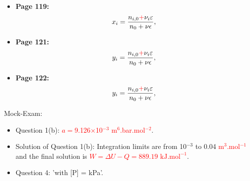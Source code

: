 \documentclass[12pts,a4paper,amsmath,amssymb,floatfix]{article}%
\newcommand{\frc}{\displaystyle\frac}
\newcommand{\red}{\textcolor{red}}
\begin{document}
\begin{itemize}
   \item {\bf Page 119:}
         \begin{displaymath}
            x_{i} = \frc{n_{i,0} \red{+} \nu_{i}\varepsilon}{n_{0}+\nu\epsilon},
         \end{displaymath}   

   \item {\bf Page 121:}
         \begin{displaymath}
            y_{i} = \frc{n_{i,0} \red{+} \nu_{i}\varepsilon}{n_{0}+\nu\epsilon},
         \end{displaymath} 

   \item {\bf Page 122:}
         \begin{displaymath}
            y_{i} = \frc{n_{i,0} \red{+} \nu_{i}\varepsilon}{n_{0}+\nu\epsilon},
         \end{displaymath}     
           
%
\end{itemize}

\noindent
{\Large Mock-Exam:}
\begin{itemize}
% 
  \item Question 1(b): \red{$a=$9.126$\times$10$^{-3}$ m$^{6}$.bar.mol$^{-2}$}. 
  \item Solution of Question 1(b): Integration limits are from 10$^{-3}$ to 0.04 \red{m$^{3}$.mol$^{-1}$} and the final solution is \red{$W= \Delta U - Q = 889.19\text{ kJ.mol}^{-1}$}.
  \item Question 4: 'with [P] = kPa'.
%
\end{itemize}
\end{document}
